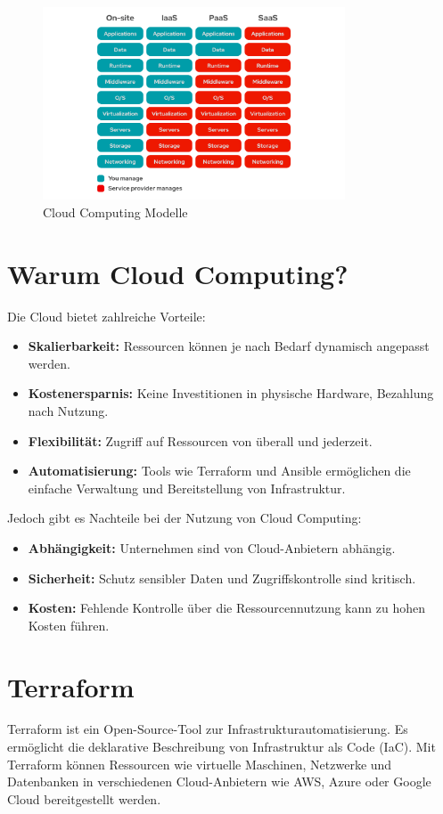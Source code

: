 \begin{figure}[H]
    \centering
    \includegraphics[width=0.8\textwidth]{resources/images/cloudcomputingtiers.png}
    \caption{Cloud Computing Modelle}
\end{figure}

\section{Warum Cloud Computing?}
Die Cloud bietet zahlreiche Vorteile:
\begin{itemize}
    \item \textbf{Skalierbarkeit:} Ressourcen können je nach Bedarf dynamisch angepasst werden.
    \item \textbf{Kostenersparnis:} Keine Investitionen in physische Hardware, Bezahlung nach Nutzung.
    \item \textbf{Flexibilität:} Zugriff auf Ressourcen von überall und jederzeit.
    \item \textbf{Automatisierung:} Tools wie Terraform und Ansible ermöglichen die einfache Verwaltung und Bereitstellung von Infrastruktur.
\end{itemize}\cite{ProCloud}

Jedoch gibt es Nachteile bei der Nutzung von Cloud Computing:
\begin{itemize}
    \item \textbf{Abhängigkeit:} Unternehmen sind von Cloud-Anbietern abhängig.
    \item \textbf{Sicherheit:} Schutz sensibler Daten und Zugriffskontrolle sind kritisch.
    \item \textbf{Kosten:} Fehlende Kontrolle über die Ressourcennutzung kann zu hohen Kosten führen.
\end{itemize}
\cite{CloudcomputingCarticle}

\section{Terraform}
Terraform ist ein Open-Source-Tool zur Infrastrukturautomatisierung. Es ermöglicht die deklarative Beschreibung von Infrastruktur als Code (IaC). Mit Terraform können Ressourcen wie virtuelle Maschinen, Netzwerke und Datenbanken in verschiedenen Cloud-Anbietern wie AWS, Azure oder Google Cloud bereitgestellt werden\cite{TerraformDocs}.


